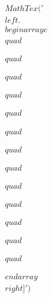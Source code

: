 \documentclass[preview]{standalone}
\begin{document}
\begin{align*}
MathTex('\\left.\\begin{array}{c}\\quad \\\\\\quad \\\\\\quad \\\\\\quad \\\\\\quad \\\\\\quad \\\\\\quad \\\\\\quad \\\\\\quad \\\\\\quad \\\\\\quad \\\\\\quad \\\\\\quad \\\\\\end{array}\\right]')
\end{align*}
\end{document}
